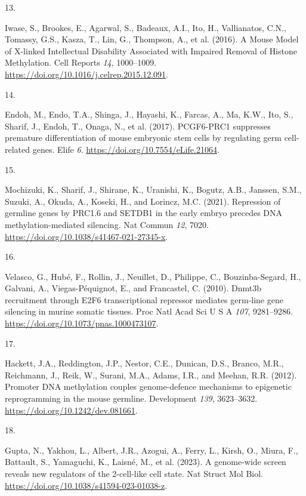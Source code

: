 \documentclass[
]{article}
\newlength{\cslhangindent}
\newlength{\csllabelwidth}
\newlength{\cslentryspacingunit} %
\newenvironment{CSLReferences}[2] %
 {%
  \setlength{\parindent}{0pt}
  \ifodd #1
  \let\oldpar\par
  \def\par{\hangindent=\cslhangindent\oldpar}
  \fi
  \setlength{\parskip}{#2\cslentryspacingunit}
 }%
 {}
\newcommand{\CSLLeftMargin}[1]{\parbox[t]{\csllabelwidth}{#1}}
\newcommand{\CSLRightInline}[1]{\parbox[t]{\linewidth - \csllabelwidth}{#1}\break}
\begin{document}
\begin{CSLReferences}{0}{0}
\leavevmode{}%
\CSLLeftMargin{13. }%
\CSLRightInline{Iwase, S., Brookes, E., Agarwal, S., Badeaux, A.I., Ito,
H., Vallianatos, C.N., Tomassy, G.S., Kasza, T., Lin, G., Thompson, A.,
et al. (2016). A {Mouse Model} of {X-linked Intellectual Disability
Associated} with {Impaired Removal} of {Histone Methylation}. Cell
Reports \emph{14}, 1000--1009.
\url{https://doi.org/10.1016/j.celrep.2015.12.091}.}

\leavevmode{}%
\CSLLeftMargin{14. }%
\CSLRightInline{Endoh, M., Endo, T.A., Shinga, J., Hayashi, K., Farcas,
A., Ma, K.W., Ito, S., Sharif, J., Endoh, T., Onaga, N., et al. (2017).
{PCGF6-PRC1} suppresses premature differentiation of mouse embryonic
stem cells by regulating germ cell-related genes. Elife \emph{6}.
\url{https://doi.org/10.7554/eLife.21064}.}

\leavevmode{}%
\CSLLeftMargin{15. }%
\CSLRightInline{Mochizuki, K., Sharif, J., Shirane, K., Uranishi, K.,
Bogutz, A.B., Janssen, S.M., Suzuki, A., Okuda, A., Koseki, H., and
Lorincz, M.C. (2021). Repression of germline genes by {PRC1}.6 and
{SETDB1} in the early embryo precedes {DNA} methylation-mediated
silencing. Nat Commun \emph{12}, 7020.
\url{https://doi.org/10.1038/s41467-021-27345-x}.}

\leavevmode{}%
\CSLLeftMargin{16. }%
\CSLRightInline{Velasco, G., Hubé, F., Rollin, J., Neuillet, D.,
Philippe, C., Bouzinba-Segard, H., Galvani, A., Viegas-Péquignot, E.,
and Francastel, C. (2010). Dnmt3b recruitment through {E2F6}
transcriptional repressor mediates germ-line gene silencing in murine
somatic tissues. Proc Natl Acad Sci U S A \emph{107}, 9281--9286.
\url{https://doi.org/10.1073/pnas.1000473107}.}

\leavevmode{}%
\CSLLeftMargin{17. }%
\CSLRightInline{Hackett, J.A., Reddington, J.P., Nestor, C.E., Dunican,
D.S., Branco, M.R., Reichmann, J., Reik, W., Surani, M.A., Adams, I.R.,
and Meehan, R.R. (2012). Promoter {DNA} methylation couples
genome-defence mechanisms to epigenetic reprogramming in the mouse
germline. Development \emph{139}, 3623--3632.
\url{https://doi.org/10.1242/dev.081661}.}

\leavevmode{}%
\CSLLeftMargin{18. }%
\CSLRightInline{Gupta, N., Yakhou, L., Albert, J.R., Azogui, A., Ferry,
L., Kirsh, O., Miura, F., Battault, S., Yamaguchi, K., Laisné, M., et
al. (2023). A genome-wide screen reveals new regulators of the
2-cell-like cell state. Nat Struct Mol Biol.
\url{https://doi.org/10.1038/s41594-023-01038-z}.}


\end{CSLReferences}
\end{document}
